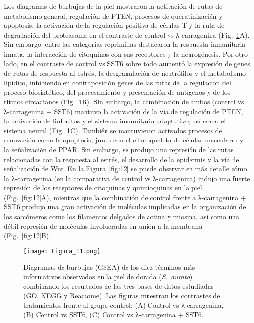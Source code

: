 \documentclass[10pt,a4paper]{article}
\begin{document}
Los diagramas de burbujas de la piel mostraron la activación de rutas de metabolismo general, regulación de PTEN, procesos de queratinización y apoptosis, la activación de la regulación positiva de células T y la ruta de degradación del proteasoma en el contraste de control vs λ-carragenina (Fig.~\ref{fig:11}A). Sin embargo, entre las categorías reprimidas destacaron la respuesta inmunitaria innata, la interacción de citoquinas con sus receptores y la neurogénesis. Por otro lado, en el contraste de control vs SST6 sobre todo aumentó la expresión de genes de rutas de respuesta al estrés, la desgranulación de neutrófilos y el metabolismo lipídico, inhibiendo en contraposición genes de las rutas de la regulación del proceso biosintético, del procesamiento y presentación de antígenos y de los ritmos circadianos (Fig.~\ref{fig:11}B). Sin embargo, la combinación de ambos (control vs λ-carragenina + SST6) mantuvo la activación de la vía de regulación de PTEN, la activación de linfocitos y el sistema inmunitario adaptativo, así como el sistema neural (Fig.~\ref{fig:11}C). También se mantuvieron activados procesos de renovación como la apoptosis, junto con el citoesqueleto de células musculares y la señalización de PPAR. Sin embargo, se produjo una represión de las rutas relacionadas con la respuesta al estrés, el desarrollo de la epidermis y la vía de señalización de Wnt. En la Figura~\ref{fig:12} se puede observar en más detalle cómo la λ-carragenina (en la comparativa de control vs λ-carragenina) indujo una fuerte represión de los receptores de citoquinas y quimioquinas en la piel (Fig.~\ref{fig:12}A), mientras que la combinación de control frente a λ-carragenina + SST6 produjo una gran activación de moléculas implicadas en la organización de los sarcómeros como los filamentos delgados de actina y miosina, así como una débil represión de moléculas involucradas en unión a la membrana (Fig.~\ref{fig:12}B).

\begin{figure}[p]                 %
  \centering
  \texttt{[image: Figura\_11.png]}
  \caption{Diagramas de burbujas (GSEA) de los diez términos más informativos observados en la piel de dorada (\textit{S.\ aurata}) combinando los resultados de las tres bases de datos estudiadas (GO, KEGG y Reactome). Las figuras muestran los contrastes de tratamientos frente al grupo control: (A) Control vs λ-carragenina, (B) Control vs SST6, (C) Control vs λ-carragenina + SST6.}

  \label{fig:11}
\end{figure}
\clearpage                          %
\end{document}
